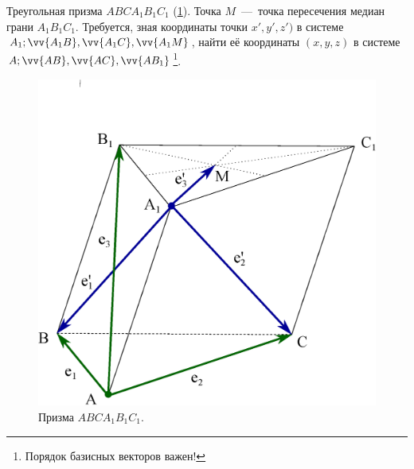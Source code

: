 \documentclass[a4paper,12pt]{article}
\begin{document}
  \begin{problem}[4.19]
    Треугольная призма $A B C A_1 B_1 C_1$ (\ref{fig:prism}).
    Точка $M$~---~точка пересечения медиан грани $A_1 B_1 C_1$.
    Требуется, зная координаты точки $x', y', z')$ в системе $A_1; \vv{A_1 B}, \vv{A_1 C}, \vv{A_1 M}$, найти её координаты $(x, y, z)$ в системе $A; \vv{AB}, \vv{AC}, \vv{AB_1}$\footnote{Порядок базисных векторов важен!}.
    \begin{figure}[h]
      \centering
    
      \includegraphics[width=0.5\columnwidth]{prism}
    
      \caption{Призма $ABC A_1 B_1 C_1$.}
      \label{fig:prism}
    \end{figure}
  \end{problem}
  
\end{document}
